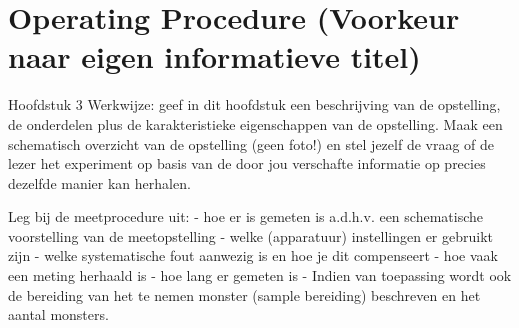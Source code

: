 \chapter{Operating Procedure (Voorkeur naar eigen informatieve titel)}

Hoofdstuk 3 Werkwijze: geef in dit hoofdstuk een beschrijving van de opstelling, de onderdelen plus de karakteristieke eigenschappen van de opstelling. Maak een schematisch overzicht van de opstelling (geen foto!) en stel jezelf de vraag of de lezer het experiment op basis van de door jou verschafte informatie op precies dezelfde manier kan herhalen.

Leg bij de meetprocedure uit:
- hoe er is gemeten is a.d.h.v. een schematische voorstelling van de meetopstelling
- welke (apparatuur) instellingen er gebruikt zijn
- welke systematische fout aanwezig is en hoe je dit compenseert
- hoe vaak een meting herhaald is
- hoe lang er gemeten is
- Indien van toepassing wordt ook de bereiding van het te nemen monster (sample bereiding) beschreven en het aantal monsters.